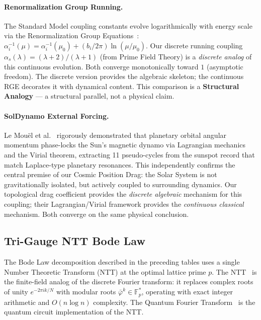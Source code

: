 \paragraph{Renormalization Group Running.}
The Standard Model coupling constants evolve logarithmically with energy scale via the Renormalization Group Equations~\cite{wilczek1973}: $\alpha_i^{-1}(\mu) = \alpha_i^{-1}(\mu_0) + (b_i / 2\pi) \ln(\mu/\mu_0)$. Our discrete running coupling $\alpha_s(\lambda) = (\lambda + 2)/(\lambda + 1)$ (from Prime Field Theory) is a \emph{discrete analog} of this continuous evolution. Both converge monotonically toward $1$ (asymptotic freedom). The discrete version provides the algebraic skeleton; the continuous RGE decorates it with dynamical content. This comparison is a \textbf{Structural Analogy} --- a structural parallel, not a physical claim.

\paragraph{SolDynamo External Forcing.}
Le Mouël et al.~\cite{lemouël2025} rigorously demonstrated that planetary orbital angular momentum phase-locks the Sun's magnetic dynamo via Lagrangian mechanics and the Virial theorem, extracting 11 pseudo-cycles from the sunspot record that match Laplace-type planetary resonances. This independently confirms the central premise of our Cosmic Position Drag: the Solar System is not gravitationally isolated, but actively coupled to surrounding dynamics. Our topological drag coefficient provides the \emph{discrete algebraic} mechanism for this coupling; their Lagrangian/Virial framework provides the \emph{continuous classical} mechanism. Both converge on the same physical conclusion.

\subsection{Tri-Gauge NTT Bode Law}
The Bode Law decomposition described in the preceding tables uses a single Number Theoretic Transform (NTT) at the optimal lattice prime $p$. The NTT~\cite{pollard1971} is the finite-field analog of the discrete Fourier transform: it replaces complex roots of unity $e^{-2\pi ik/N}$ with modular roots $\bar\varphi^k \in \mathbb{F}_p^*$, operating with exact integer arithmetic and $O(n \log n)$ complexity. The Quantum Fourier Transform~\cite{shor1994} is the quantum circuit implementation of the NTT.

